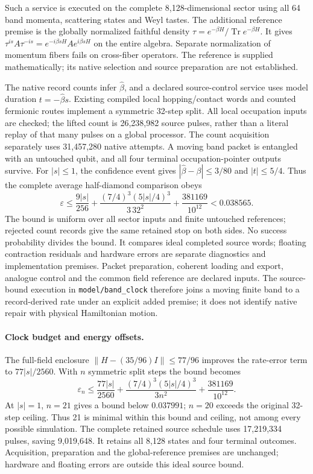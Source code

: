 Such a service is executed on the complete 8,128-dimensional sector using
all 64 band momenta, scattering states and Weyl tastes. The additional
reference premise is the globally normalized faithful density
$\tau=e^{-\beta H}/\operatorname{Tr}e^{-\beta H}$. It gives
$\tau^{is}A\tau^{-is}=e^{-i\beta sH}Ae^{i\beta sH}$ on the entire algebra.
Separate normalization of momentum fibers fails on cross-fiber operators.
The reference is supplied mathematically; its native selection and source
preparation are not established.

The native record counts infer $\widehat\beta$, and a declared source-control
service uses model duration $t=-\widehat\beta s$. Existing compiled local
hopping/contact words and counted fermionic routes implement a symmetric
32-step split. All local occupation inputs are checked; the lifted count
is 26,238,982 source pulses, rather than a literal replay of that many
pulses on a global processor. The count acquisition separately uses
31,457,280 native attempts. A moving band packet is entangled with an
untouched qubit, and all four terminal occupation-pointer outputs survive.
For $|s|\le1$, the confidence event gives
$|\widehat\beta-\beta|\le3/80$ and $|t|\le5/4$. Thus the complete average
half-diamond comparison obeys
\[
 \varepsilon\le\frac{9|s|}{256}
 +\frac{(7/4)^3(5|s|/4)^3}{3\,32^2}
 +\frac{381169}{10^{12}}<0.038565.
\]
The bound is uniform over all sector inputs and finite untouched references;
rejected count records give the same retained stop on both sides. No success
probability divides the bound. It compares ideal completed source words;
floating contraction residuals and hardware errors are separate diagnostics
and implementation premises. Packet preparation, coherent loading and
export, analogue control and the common field reference are declared inputs.
The source-bound execution in \texttt{model/band\_clock} therefore joins a
moving finite band to a record-derived rate under an explicit added premise;
it does not identify native repair with physical Hamiltonian motion.

\paragraph{Clock budget and energy offsets.}
The full-field enclosure
$\|H-(35/96)I\|\le77/96$ improves the rate-error term to
$77|s|/2560$. With $n$ symmetric split steps the bound becomes
\[
 \varepsilon_n\le\frac{77|s|}{2560}
 +\frac{(7/4)^3(5|s|/4)^3}{3n^2}
 +\frac{381169}{10^{12}}.
\]
At $|s|=1$, $n=21$ gives a bound below $0.037991$; $n=20$
exceeds the original 32-step ceiling. Thus 21 is minimal within this bound
and ceiling, not among every possible simulation. The complete retained
source schedule uses 17,219,334 pulses, saving 9,019,648. It retains all
8,128 states and four terminal outcomes. Acquisition, preparation and the
global-reference premises are unchanged; hardware and floating errors are
outside this ideal source bound.

